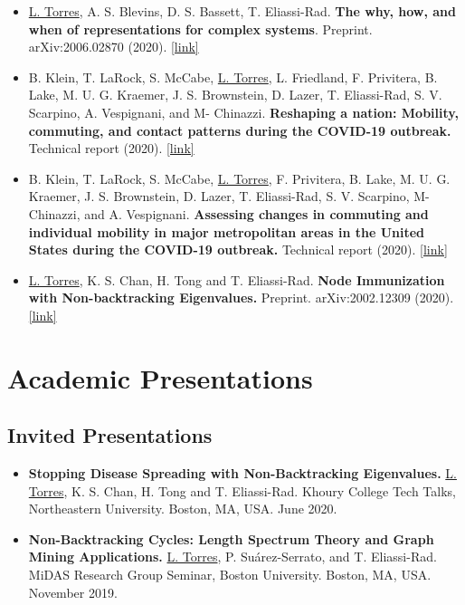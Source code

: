 \documentclass[12pt,]{scrartcl}
\newenvironment{myitemize}
{ \begin{itemize}
    \setlength{\itemsep}{5pt}
    \setlength{\parskip}{0pt}
    \setlength{\parsep}{0pt}     }
{ \end{itemize}                  }
\begin{document}
\begin{myitemize}
\leftskip-0.25in %

\item \underline{L. Torres}, A. S. Blevins, D. S. Bassett, T. Eliassi-Rad. \textbf{The why, how, and when of representations for complex systems}. Preprint. arXiv:2006.02870 (2020). \href{https://arxiv.org/abs/2006.02870}{[link]}

\item B. Klein, T. LaRock, S. McCabe, \underline{L. Torres}, L. Friedland, F. Privitera, B. Lake, M. U. G. Kraemer, J. S. Brownstein, D. Lazer, T. Eliassi-Rad, S. V. Scarpino, A. Vespignani, and M- Chinazzi. \textbf{Reshaping a nation: Mobility, commuting, and contact patterns during the COVID-19 outbreak.} Technical report (2020). \href{https://www.mobs-lab.org/uploads/6/7/8/7/6787877/covid19mobility_report2.pdf}{[link]}

\item B. Klein, T. LaRock, S. McCabe, \underline{L. Torres}, F. Privitera, B. Lake, M. U. G. Kraemer, J. S. Brownstein, D. Lazer, T. Eliassi-Rad, S. V. Scarpino, M- Chinazzi, and A. Vespignani. \textbf{Assessing changes in commuting and individual mobility in major metropolitan areas in the United States during the COVID-19 outbreak.} Technical report (2020). \href{https://www.mobs-lab.org/uploads/6/7/8/7/6787877/assessing_mobility_changes_in_the_united_states_during_the_covid_19_outbreak.pdf}{[link]}

\item \underline{L. Torres}, K. S. Chan, H. Tong and T. Eliassi-Rad. \textbf{Node Immunization with Non-backtracking Eigenvalues.} Preprint. arXiv:2002.12309 (2020). \href{https://arxiv.org/abs/2002.12309}{[link]}

\end{myitemize}


\section{Academic Presentations}\label{presentations}

\subsection{Invited Presentations}\label{invited-presentations}

\begin{myitemize}
\leftskip-0.25in %

\item \textbf{Stopping Disease Spreading with Non-Backtracking Eigenvalues.} \underline{L. Torres}, K. S. Chan, H. Tong and T. Eliassi-Rad. Khoury College Tech Talks, Northeastern University. Boston, MA, USA. June 2020.

\item \textbf{Non-Backtracking Cycles: Length Spectrum Theory and Graph Mining Applications.} \underline{L. Torres}, P. Su\'arez-Serrato, and T. Eliassi-Rad. MiDAS Research Group Seminar, Boston University. Boston, MA, USA. November 2019.

\end{myitemize}
\end{document}
